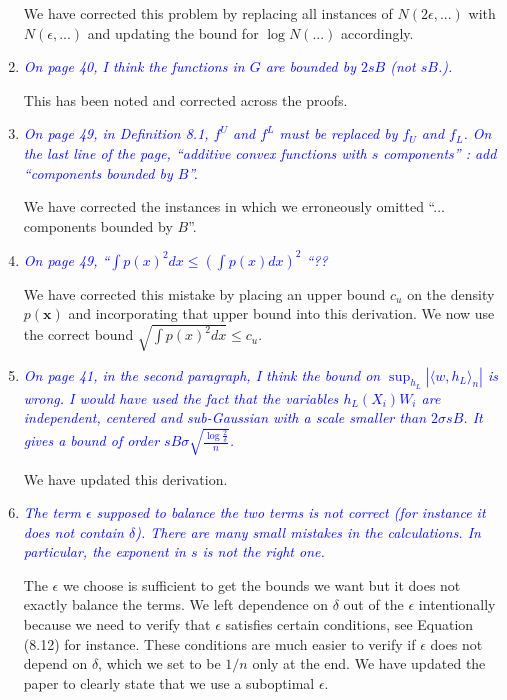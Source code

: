 \documentclass[pdftex,12pt]{article}
\def\rc#1{{\it\textcolor{blue}{#1}}\smallskip}
\begin{document}
\begin{enumerate}
We have corrected this problem by replacing all instances of $N(2\epsilon,...)$ with $N(\epsilon, ...)$ and updating the bound for $\log N(...)$ accordingly. 

\item \rc{On page 40, I think the functions in $G$ are bounded by $2sB$ (not $sB$.).}

This has been noted and corrected across the proofs.

\item \rc{On page 49, in Definition 8.1, $f^U$ and $f^L$ must be replaced by $f_U$ and
$f_L$. On the last line of the page, ``additive convex functions with $s$
components'' : add ``components bounded by $B$''.}

We have corrected the instances in which we erroneously omitted ``... components bounded by $B$''.

\item \rc{On page 49, ``$\int p(x)^2dx \leq (\int p(x)dx)^2$ ``??}

We have corrected this mistake by placing an upper bound $c_u$ on the density $p(\mathbf{x})$ and incorporating that upper bound into this derivation. We now use the correct bound $\sqrt{ \int p(x)^2 dx } \leq c_u$.

\item \rc{On page 41, in the second paragraph, I think the bound on $\sup_{h_L} |⟨w,h_L⟩_n|$ is
wrong. I would have used the fact that the variables $h_L(X_i) W_i$ are
independent, centered and sub-Gaussian with a scale smaller than
$2\sigma s B$. It gives a bound of order $sB\sigma \sqrt{\frac{\log\frac{2}{\delta}}{n}}$.}

We have updated this derivation.

\item \rc{The term $\epsilon$ supposed to balance the two terms is not correct (for
instance it does not contain $\delta$). There are many small mistakes in the
calculations. In particular, the exponent in $s$ is not the right one.}

The $\epsilon$ we choose is sufficient to get the bounds we want but it does not exactly balance the terms. We left dependence on $\delta$ out of the $\epsilon$ intentionally because we need to verify that $\epsilon$ satisfies certain conditions, see Equation (8.12) for instance. These conditions are much easier to verify if $\epsilon$ does not depend on $\delta$, which we set to be $1/n$ only at the end. We have updated the paper to clearly state that we use a suboptimal $\epsilon$.


\end{enumerate}
\end{document}
